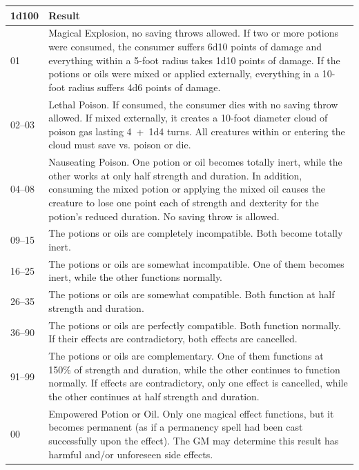 \begin{multicols}{2}
\begin{minipage}{\columnwidth}
\label{potionmix}
\noindent
\begin{tabular}{|p{}|p{}|}
\hline
1d100	& Result \\
\hline\hline
\rowcolor[gray]{.9}01	& Magical Explosion, no saving throws allowed.  If two or more potions were consumed, the consumer suffers 6d10 points of damage and everything within a 5-foot radius takes 1d10 points of damage.  If the potions or oils were mixed or applied externally, everything in a 10-foot radius suffers 4d6 points of damage. \\
02--03	& Lethal Poison.  If consumed, the consumer dies with no saving throw allowed.  If mixed externally, it creates a 10-foot diameter cloud of poison gas lasting 4~+~1d4 turns.  All creatures within or entering the cloud must save vs. poison or die. \\
\rowcolor[gray]{.9}04--08	& Nauseating Poison.  One potion or oil becomes totally inert, while the other works at only half strength and duration.  In addition, consuming the mixed potion or applying the mixed oil causes the creature to lose one point each of strength and dexterity for the potion's reduced duration.  No saving throw is allowed.  \\
09--15	& The potions or oils are completely incompatible.  Both become totally inert. \\
\rowcolor[gray]{.9}16--25	& The potions or oils are somewhat incompatible.  One of them becomes inert, while the other functions normally. \\
26--35	& The potions or oils are somewhat compatible.  Both function at half strength and duration. \\
\rowcolor[gray]{.9}36--90	& The potions or oils are perfectly compatible.  Both function normally.  If their effects are contradictory, both effects are cancelled. \\
91--99	& The potions or oils are complementary.  One of them functions at 150\% of strength and duration, while the other continues to function normally.  If effects are contradictory, only one effect is cancelled, while the other continues at half strength and duration. \\
\rowcolor[gray]{.9}00	& Empowered Potion or Oil.  Only one magical effect functions, but it becomes permanent (as if a permanency spell had been cast successfully upon the effect).  The GM may determine this result has harmful and/or unforeseen side effects. \\
\hline
\end{tabular}


\end{minipage}
\end{multicols}
